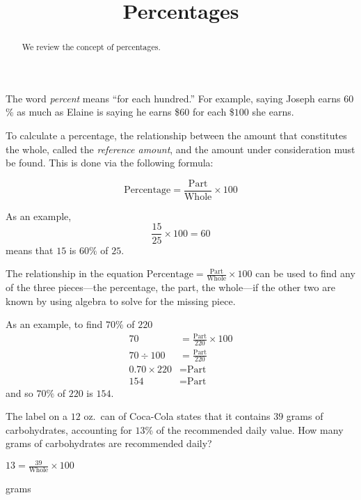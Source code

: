 \documentclass{ximera}
\title{Percentages}
\begin{document}
\begin{abstract}
We review the concept of percentages.
\end{abstract}
\maketitle

The word \emph{percent} means ``for each hundred.'' For example, saying Joseph earns $60$\% as much as Elaine is saying he earns \$$60$ for each \$$100$ she earns.

To calculate a percentage, the relationship between the amount that constitutes the whole, called the \emph{reference amount}, and the amount under consideration must be found. This is done via the following formula:

\begin{equation}\label{basicpercentage}
\text{Percentage}=\frac{\text{Part}}{\text{Whole}}\times 100
\end{equation}


As an example,
\[
\frac{15}{25}\times 100=60
\]
means that $15$ is $60\%$ of $25$.

The relationship in the equation $\text{Percentage}=\frac{\text{Part}}{\text{Whole}}\times 100$ can be used to find any of the three pieces---the percentage, the part, the whole---if the other two are known by using algebra to solve for the missing piece.

As an example, to find $70\%$ of $220$
\begin{align*}
70&=\frac{\text{Part}}{220}\times 100\\
70\div 100 &=\frac{\text{Part}}{220}\\
0.70\times 220 &=\text{Part}\\
154&=\text{Part}
\end{align*}
and so $70\%$ of $220$ is $154$.

\begin{question}
The label on a $12$ oz.\ can of Coca-Cola states that it contains $39$ grams of carbohydrates, accounting for $13$\% of the recommended daily value. How many grams of carbohydrates are recommended daily?

\begin{hint}
$\displaystyle 13=\frac{39}{\text{Whole}}\times 100$
\end{hint}
 grams

\end{question}
\end{document}
